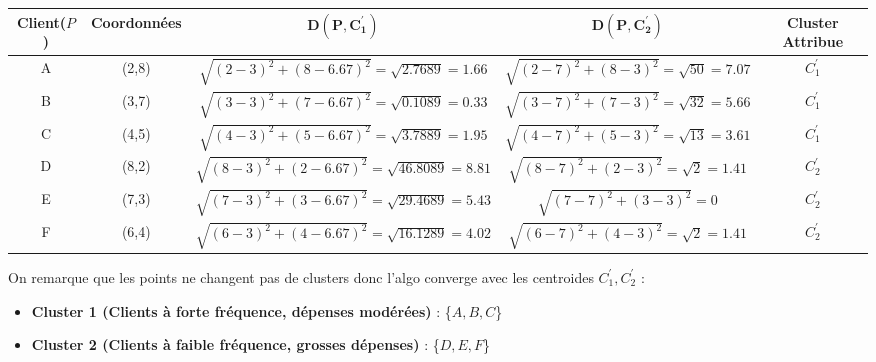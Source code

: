\documentclass{article}
\begin{document}
\begin{table}[h]
\centering

\renewcommand{\arraystretch}{2.25} 
\setlength{\tabcolsep}{0.75pt}      

\begin{tabular}{|c|c|c|c|c|} 
\hline
\textbf{Client($P$)} & \textbf{Coordonnées} & $\mathbf{D(P,C^{'}_1)}$ & $\mathbf{D(P,C^{'}_2)}$ & Cluster Attribue  \\ \hline
A        & (2,8)          & $\sqrt{(2-3)^2 + (8-6.67)^2} = \sqrt{2.7689} =1.66 $  & $\sqrt{(2-7)^2 + (8-3)^2} = \sqrt{50} = 7.07$    & $C^{'}_1$  \\ \hline
B          & (3,7) & $\sqrt{(3-3)^2 + (7-6.67)^2} = \sqrt{0.1089} = 0.33$  & $\sqrt{(3-7)^2 + (7-3)^2} = \sqrt{32} = 5.66$    & $C^{'}_1$  \\ \hline
C & (4,5) & $\sqrt{(4-3)^2 + (5-6.67)^2} = \sqrt{3.7889} = 1.95$  & $\sqrt{(4-7)^2 + (5-3)^2} = \sqrt{13} = 3.61$    & $C^{'}_1$  \\ \hline
D        & (8,2)& $\sqrt{(8-3)^2 + (2-6.67)^2} = \sqrt{46.8089} = 8.81$  & $\sqrt{(8-7)^2 + (2-3)^2} = \sqrt{2} =1.41$    & $C^{'}_2$  \\ \hline     
E          & (7,3)& $\sqrt{(7-3)^2 + (3-6.67)^2} = \sqrt{29.4689} = 5.43$  & $\sqrt{(7-7)^2 + (3-3)^2} = 0$    & $C^{'}_2$  \\ \hline           
F      & (6,4) & $\sqrt{(6-3)^2 + (4-6.67)^2} = \sqrt{16.1289} = 4.02$  & $\sqrt{(6-7)^2 + (4-3)^2} = \sqrt{2} = 1.41$    & $C^{'}_2$  \\ \hline           

\end{tabular}
\end{table}


\vspace{0.45cm}

On remarque que les points ne changent pas de clusters donc l'algo converge avec les centroides $C^{'}_1 , C^{'}_2$ :

\begin{itemize}
    \setlength{\itemsep}{0pt}
    \item \textbf{Cluster 1 (Clients à forte fréquence, dépenses modérées)} : \{$A, B, C$\}
    \item \textbf{Cluster 2 (Clients à faible fréquence, grosses dépenses)} : \{$D, E, F$\}
\end{itemize}

\end{document}
